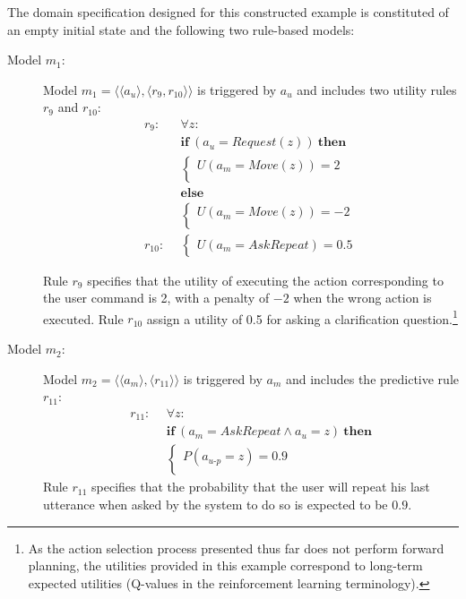 The domain specification designed for this constructed example is constituted of an empty initial state and the following two rule-based models: \begin{description}
\item[Model $m_1$: ] Model $m_1 = \langle \langle a_u \rangle, \langle r_9, r_{10} \rangle \rangle$ is triggered by $a_u$ and includes two utility rules $r_{9}$ and $r_{10}$:
\begin{align*}
r_{9}: \ \ & \forall z: \\ 
& \textbf{if} \ (a_u = Request(z)) \ \textbf{then} \\ 
& \begin{cases} 
U(a_m = Move(z)) = 2 \\ 
\end{cases} \\
& \textbf{else} \\ 
& \begin{cases} 
U(a_m = Move(z)) = -2 \\ 
\end{cases} \\[4mm]
r_{10}: \ \ &  \begin{cases} U(a_m = \mathit{AskRepeat}) = 0.5 \end{cases}
\end{align*}

Rule $r_{9}$ specifies that the utility of executing the action corresponding to the user command is 2, with a penalty of $-2$ when the wrong action is executed. Rule $r_{10}$ assign a utility of 0.5 for asking a clarification question.\footnote{As the action selection process presented thus far does not perform forward planning, the utilities provided in this example correspond to long-term expected utilities (Q-values in the reinforcement learning terminology).}

\item[Model $m_2$: ] Model $m_2 = \langle \langle a_m \rangle, \langle r_{11} \rangle \rangle$ is triggered by $a_m$ and includes the predictive rule $r_{11}$: 
\begin{align*}
r_{11}: \ \ & \forall z: \\ 
& \textbf{if} \ (a_m = \mathit{AskRepeat} \land a_u=z) \ \textbf{then} \\ 
& \begin{cases} 
P(a_{u\mbox{-}p} = z) = 0.9 \\ 
\end{cases}
\end{align*}
Rule $r_{11}$ specifies that the probability that the user will repeat his last utterance when asked by the system to do so is expected to be $0.9$.
\end{description}

